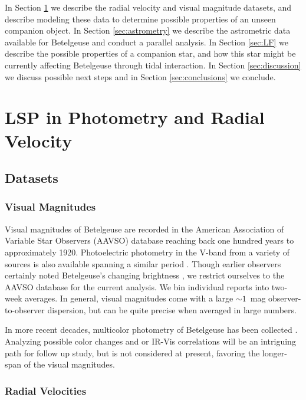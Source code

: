 \documentclass[twocolumn]{aastex631}
\begin{document}
In Section \ref{sec:RV} we describe the radial velocity and visual magnitude datasets, and describe modeling these data to determine possible properties of an unseen companion object. In Section \ref{sec:astrometry} we describe the astrometric data available for Betelgeuse and conduct a parallel analysis. In Section \ref{sec:LF} we describe the possible properties of a companion star, and how this star might be currently affecting Betelgeuse through tidal interaction. In Section \ref{sec:discussion} we discuss possible next steps and in Section \ref{sec:conclusions} we conclude. 




\section{LSP in Photometry and Radial Velocity}\label{sec:RV}
\subsection{Datasets}

\subsubsection{Visual Magnitudes}
Visual magnitudes of Betelgeuse are recorded in the American Association of Variable Star Observers (AAVSO) database reaching back one hundred years to approximately 1920. Photoelectric photometry in the V-band from a variety of sources is also available spanning a similar period \citep[e.g.][]{2024arXiv240809089G}. Though earlier observers certainly noted Betelgeuse's changing brightness \citep[e.g.][]{1869ABSBo...7..315A,1913AN....194...81O,1913PA.....21....5S}, we restrict ourselves to the AAVSO database for the current analysis. We bin individual reports into two-week averages. In general, visual magnitudes come with a large $\sim 1$~mag observer-to-observer dispersion, but can be quite precise when averaged in large numbers.

In more recent decades, multicolor photometry of Betelgeuse has been collected \citep[e.g.][]{2022OEJV..233....1O,2022NatAs...6..930T}. Analyzing possible color changes and or IR-Vis correlations will be an intriguing path for follow up study, but is not considered at present, favoring the longer-span of the visual magnitudes. 

\subsubsection{Radial Velocities}
\end{document}
